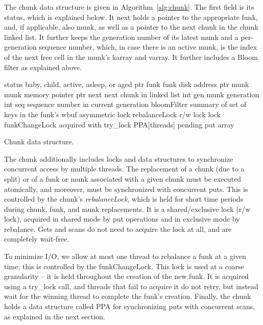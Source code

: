 The chunk data structure is given in Algorithm~\ref{alg:chunk}. 
The first field is its status, which is explained  below. 
It next holds a pointer to the appropriate funk, and, if applicable, also munk, as well as a pointer to the next 
chunk in the chunk linked list.
It further keeps the generation number of its latest munk and a per-generation sequence number,
which, in case there is an active munk, is the index of the next free cell in the munk's karray and varray.
It further includes a Bloom filter as explained above.

\begin{algorithm}[htb]
\begin{algorithmic}
\State status \Comment  baby, child, active, asleep, or aged
\State ptr funk \Comment funk disk address
\State ptr munk \Comment munk memory pointer
\State ptr next \Comment next chunk in linked list
\State int gen \Comment munk generation
\State int seq \Comment sequence number in current generation 
\State bloomFilter \Comment summary of set of keys in the funk's wbuf
\State asymmetric lock rebalanceLock \Comment r/w lock 
\State lock funkChangeLock \Comment acquired with try\_lock 
\State PPA[threads] \Comment pending put array
\end{algorithmic}
\caption{Chunk data structure.}
\label{alg:chunk}
\end{algorithm}


The chunk additionally includes locks and data structures to synchronize concurrent access by multiple threads.
The replacement of a chunk (due to a split) or of a funk or munk associated with a given chunk 
must be executed atomically, and moreover, must be synchronized with concurrent puts. 
This is controlled by the chunk's \emph{rebalanceLock}, which is held for short time periods
during chunk, funk, and munk replacements.  It is a shared/exclusive lock (r/w lock), acquired in shared mode 
by put operations and in exclusive mode by rebalance. Gets and scans do not need to acquire the lock at all,
and are completely wait-free.

To minimize I/O, we allow at most one thread to rebalance a funk at a given time; this is controlled by 
the  funkChangeLock. This lock is used at a coarse granularity -- it is held throughout the creation of the new funk. 
It is acquired using a try\_lock call, and threads that fail to acquire it do not retry, but instead wait for the winning thread 
to complete the funk's creation.
Finally, the chunk holds a data structure called PPA for synchronizing  puts with concurrent scans, as explained in the next section. 

